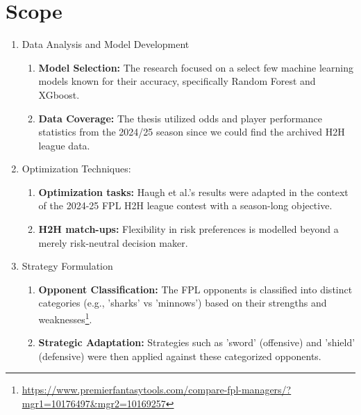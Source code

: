 \documentclass[12pt,oneside,a4paper]{book}
\theoremstyle{definition}
\theoremstyle{remark}
\begin{document}
		\section{Scope} \label{sec:scope}
			\begin{enumerate}
				\item[(i)] Data Analysis and Model Development
				\begin{enumerate}
					\item \textbf{Model Selection:} The research focused on a select few machine learning models known for their accuracy, specifically Random Forest and XGboost.
					\item \textbf{Data Coverage:} The thesis utilized odds and player performance statistics from the 2024/25 season since we could find the archived H2H league data.
				\end{enumerate}

				\item[(ii)] Optimization Techniques:
				\begin{enumerate}
					\item \textbf{Optimization tasks:} Haugh et al.\cite{haugh2021play}’s results were  adapted  in the context of the 2024-25 FPL H2H league contest with a season-long objective.
					\item \textbf{H2H match-ups:} Flexibility in risk preferences is modelled beyond a merely risk-neutral decision maker.
				\end{enumerate}

				\item[(iii)] Strategy Formulation
				\begin{enumerate}
					\item \textbf{Opponent Classification:} The FPL opponents is  classified into distinct categories (e.g., 'sharks' vs 'minnows') based on their strengths and weaknesses\footnote{\url{https://www.premierfantasytools.com/compare-fpl-managers/?mgr1=10176497&mgr2=10169257}}.
					\item \textbf{Strategic Adaptation:} Strategies such as 'sword' (offensive) and 'shield' (defensive) were then applied against these categorized opponents.
				\end{enumerate}



\end{enumerate}
\end{document}

